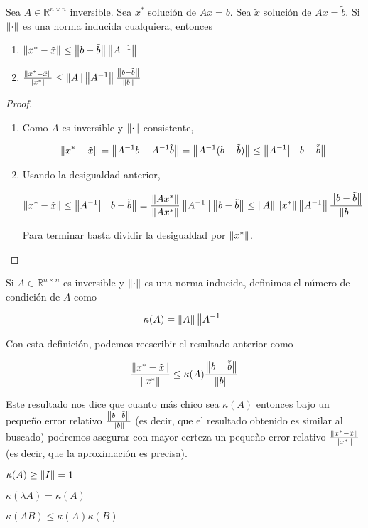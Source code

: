 \begin{propo}
Sea $A \in \mathbb{R}^{n \times n}$ inversible. Sea $x^*$ solución de $Ax = b$. Sea $\tilde{x}$ solución de $Ax = \tilde{b}$. Si $\left\lVert\cdot\right\rVert$ es una norma inducida cualquiera, entonces
\begin{enumerate}
\item $\left\lVert x^* - \tilde{x}\right\rVert \leq \left\lVert b - \tilde{b}\right\rVert \left\lVert A^{-1}\right\rVert$
\item $\frac{\left\lVert x^* - \tilde{x}\right\rVert}{\left\lVert x^*\right\rVert} \leq \left\lVert A\right\rVert \left\lVert A^{-1}\right\rVert \frac{\left\lVert b - \tilde{b}\right\rVert}{\left\lVert b\right\rVert}$
\end{enumerate}

\begin{proof}
\begin{enumerate}
\item Como $A$ es inversible y $\left\lVert\cdot\right\rVert$ consistente,

\[\left\lVert x^* - \tilde{x}\right\rVert = \left\lVert A^{-1}b - A^{-1}\tilde{b}\right\rVert = \left\lVert A^{-1}(b - \tilde{b})\right\rVert \leq \left\lVert A^{-1}\right\rVert \left\lVert b - \tilde{b}\right\rVert\]

\item Usando la desigualdad anterior,

\[\left\lVert x^* - \tilde{x}\right\rVert \leq \left\lVert A^{-1}\right\rVert \left\lVert b - \tilde{b}\right\rVert = \frac{\left\lVert Ax^*\right\rVert}{\left\lVert Ax^*\right\rVert} \left\lVert A^{-1}\right\rVert \left\lVert b - \tilde{b}\right\rVert \leq \left\lVert A\right\rVert \left\lVert x^*\right\rVert \left\lVert A^{-1}\right\rVert \frac{\left\lVert b - \tilde{b}\right\rVert}{\left\lVert b\right\rVert}\]

Para terminar basta dividir la desigualdad por $\left\lVert x^*\right\rVert$.

\end{enumerate}

\end{proof}

\end{propo}

\begin{defi}
Si $A\in \mathbb{R}^{n \times n}$ es inversible y $\left\lVert\cdot\right\rVert$ es una norma inducida, definimos el número de condición de $A$ como

\[\kappa(A) = \left\lVert A\right\rVert\left\lVert A^{-1}\right\rVert\]
\end{defi}

Con esta definición, podemos reescribir el resultado anterior como

\begin{coro}
\[\frac{\left\lVert x^* - \tilde{x}\right\rVert}{\left\lVert x^*\right\rVert} \leq \kappa(A) \frac{\left\lVert b - \tilde{b}\right\rVert}{\left\lVert b\right\rVert}\]
\end{coro}

Este resultado nos dice que cuanto más chico sea $\kappa(A)$ entonces bajo un pequeño error relativo $\frac{\left\lVert b - \tilde{b}\right\rVert}{\left\lVert b\right\rVert}$ (es decir, que el resultado obtenido es similar al buscado) podremos asegurar con mayor certeza un pequeño error relativo $\frac{\left\lVert x^* - \tilde{x}\right\rVert}{\left\lVert x^*\right\rVert}$ (es decir, que la aproximación es precisa).

\begin{obs}
$\kappa(A) \geq \left\lVert I\right\rVert = 1$
\end{obs}

\begin{obs}
$\kappa(\lambda A) = \kappa(A)$
\end{obs}

\begin{obs}
$\kappa(AB) \leq \kappa(A)\kappa(B)$
\end{obs}
